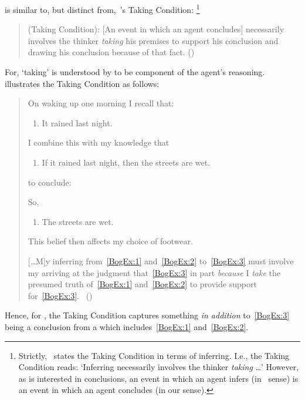 \begin{note}
 \supportI{} is similar to, but distinct from,~\citeauthor{Boghossian:2014aa}'s Taking Condition:%
  \footnote{
    Strictly,~\citeauthor{Boghossian:2014aa} states the Taking Condition in terms of inferring.
    I.e., the Taking Condition reads: `Inferring necessarily involves the thinker \emph{taking} \dots'
    However, as \citeauthor{Boghossian:2008vf} is interested in conclusions, an event in which an agent infers (in~\citeauthor{Boghossian:2014aa} sense) is an event in which an agent concludes (in our sense).
  }

  \begin{quote}
    (Taking Condition):
    [An event in which an agent concludes] necessarily involves the thinker \emph{taking} his premises to support his conclusion and drawing his conclusion because of that fact.%
    \mbox{}\hfill\mbox{(\citeyear[5]{Boghossian:2014aa})}
  \end{quote}

  \noindent%
  For, `taking' is understood by \citeauthor{Boghossian:2014aa} to be component of the agent's reasoning.
  \citeauthor{Boghossian:2014aa} illustrates the Taking Condition as follows:
  \begin{quote}
    On waking up one morning I recall that:

    \begin{enumerate}[label=(\arabic*), ref=(\arabic*), series=BogEx]
    \item
      \label{BogEx:1}
      It rained last night.
    \end{enumerate}

    I combine this with my knowledge that

    \begin{enumerate}[label=(\arabic*), ref=(\arabic*), resume*=BogEx]
    \item
      \label{BogEx:2}
      If it rained last night, then the streets are wet.
    \end{enumerate}

    to conclude:

    So,

    \begin{enumerate}[label=(\arabic*), ref=(\arabic*), resume*=BogEx]
    \item
      \label{BogEx:3}
      The streets are wet.
    \end{enumerate}
    This belief then affects my choice of footwear.%

    [\dots M]y inferring from~\ref{BogEx:1} and~\ref{BogEx:2} to~\ref{BogEx:3} must involve my arriving at the judgment that~\ref{BogEx:3} in part \emph{because} I \emph{take} the presumed truth of~\ref{BogEx:1} and~\ref{BogEx:2} to provide support for~\ref{BogEx:3}.%
    \mbox{ }\hfill\mbox{(\citeyear[2,4]{Boghossian:2014aa})}
  \end{quote}
  Hence, for \citeauthor{Boghossian:2014aa}, the Taking Condition captures something \emph{in addition} to~\ref{BogEx:3} being a conclusion from a \pool{} which includes~\ref{BogEx:1} and~\ref{BogEx:2}.


\end{note}
